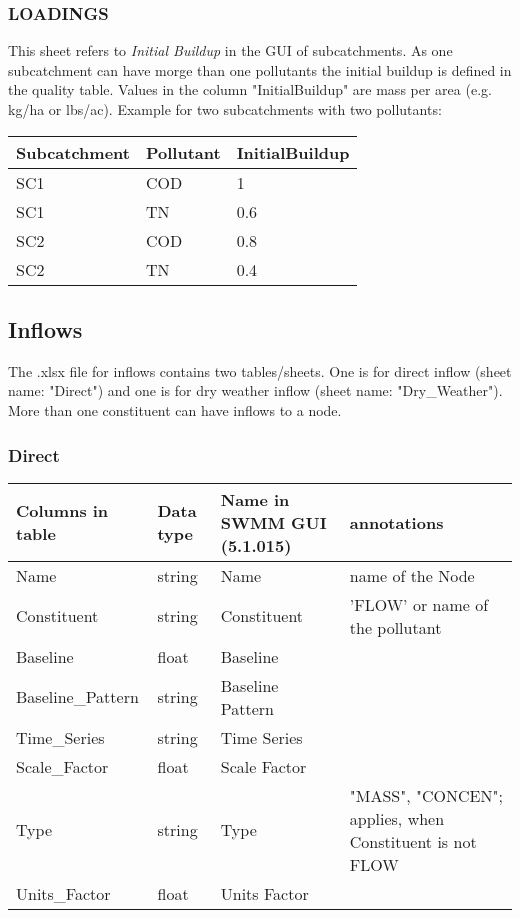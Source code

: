 \documentclass[10pt,a4paper,oneside]{scrbook}
\begin{document}
\subsubsection{LOADINGS}
This sheet refers to \textit{Initial Buildup} in the GUI of subcatchments. As one subcatchment can have morge than one pollutants the initial buildup is defined in the quality table. Values in the column "InitialBuildup" are mass per area (e.g. kg/ha or lbs/ac). Example for two subcatchments with two pollutants:\\
\begin{tabular}{|p{5cm}|p{2cm}|P{3cm}|}
\hline 
\textbf{Subcatchment} & \textbf{Pollutant} & \textbf{InitialBuildup}\\ 
\hline
SC1 & COD & 1\\
\hline
SC1 & TN & 0.6\\
\hline
SC2 & COD & 0.8\\
\hline
SC2 & TN & 0.4\\
\hline
\end{tabular}


\newpage
\subsection{Inflows}
The .xlsx file for inflows contains two tables/sheets. One is for direct inflow (sheet name: "Direct") and one is for dry weather inflow (sheet name: "Dry\_Weather"). More than one constituent can have inflows to a node. 
\subsubsection{Direct}
\begin{tabular}{p{4cm}|p{1.3cm}|P{3cm}|P{5.7cm}}
\hline 
\textbf{Columns in table} & \textbf{Data type} & \textbf{Name in SWMM GUI (5.1.015)} & \textbf{annotations}\\ 
\hline 
Name & string & Name & name of the Node\\
Constituent & string & Constituent & 'FLOW' or name of the pollutant\\ 
Baseline & float & Baseline & \\ 
Baseline\_Pattern & string & Baseline Pattern & \\ 
Time\_Series & string & Time Series & \\ 
Scale\_Factor & float & Scale Factor & \\ 
Type & string & Type & "MASS", "CONCEN"; applies, when Constituent is not FLOW\\ 
Units\_Factor & float & Units Factor & \\ 
\hline
\end{tabular}
\end{document}
